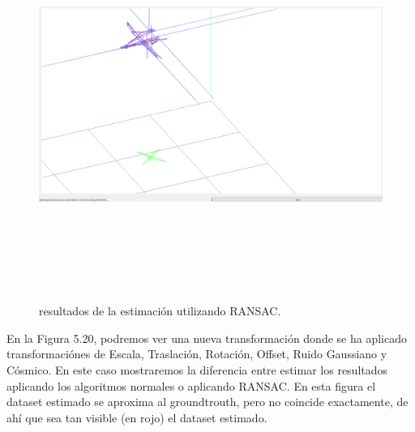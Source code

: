 \begin{figure}
\begin{center}
\label{fig:opciones de View}\includegraphics[height=12.0cm,width=18.0cm]{img/cap6/SalaTraslaRotaGausCosmicNoise-ab.png}
\hspace{0.5cm}

\end{center}

\caption{ resultados de la estimación  utilizando RANSAC.}
\end{figure}

En la Figura 5.20, podremos ver una nueva transformación donde se ha aplicado transformaciónes de Escala, Traslación, Rotación, Offset, Ruido Gaussiano y Cósmico.
En este caso mostraremos la diferencia entre estimar los resultados aplicando los algoritmos normales o aplicando RANSAC. En esta figura el dataset estimado se aproxima al groundtrouth, pero no coincide exactamente, de ahí que sea tan visible (en rojo) el dataset estimado.


